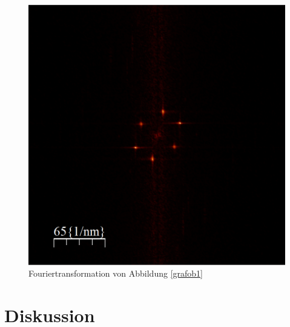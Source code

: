 \documentclass[10pt,a4paper]{article}
\begin{document}
\begin{figure}[h]
	\centering
	
	\includegraphics[scale = 0.5]{Fouriertrasformation_kristall.png}
	
	\caption{Fouriertransformation von Abbildung \ref{grafob1}}
	\label{fouriertansformation_ebene}
\end{figure}




\section{ Diskussion}
\end{document}
